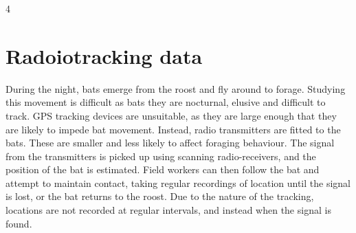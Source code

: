 4
\section{Radoiotracking data}

During the night, bats emerge from the roost and fly around to forage. Studying this movement is difficult as bats they are nocturnal, elusive and difficult to track. GPS tracking devices are unsuitable, as they are large enough that they are likely to impede bat movement. Instead, radio transmitters are fitted to the bats. These are smaller and less likely to affect foraging behaviour. The signal from the transmitters is picked up using scanning radio-receivers, and the position of the bat is estimated. Field workers can then follow the bat and attempt to maintain contact, taking regular recordings of location until the signal is lost, or the bat returns to the roost. Due to the nature of the tracking, locations are not recorded at regular intervals, and instead when the signal is found.

